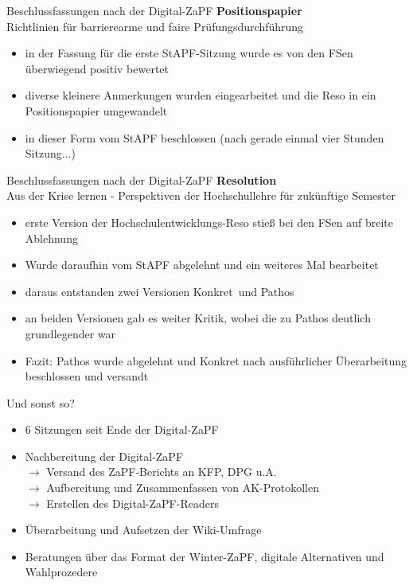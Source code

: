 \documentclass[compress, aspectratio=169]{beamer}
\begin{document}
\begin{frame}{Beschlussfassungen nach der Digital-ZaPF}
\textbf{Positionspapier}\\
Richtlinien für barrierearme und faire Prüfungsdurchführung
\begin{itemize}
\item in der Fassung für die erste StAPF-Sitzung wurde es von den FSen überwiegend positiv bewertet
\item diverse kleinere Anmerkungen wurden eingearbeitet und die Reso in ein Positionspapier umgewandelt
\item in dieser Form vom StAPF beschlossen (nach gerade einmal vier Stunden Sitzung...)
\end{itemize}
\end{frame}

\begin{frame}{Beschlussfassungen nach der Digital-ZaPF}
\textbf{Resolution}\\
Aus der Krise lernen - Perspektiven der Hochschullehre für zukünftige Semester
\begin{itemize}
\item erste Version der Hochschulentwicklungs-Reso stieß bei den FSen auf breite Ablehnung
\item Wurde daraufhin vom StAPF abgelehnt und ein weiteres Mal bearbeitet
\item daraus entstanden zwei Versionen \glqq Konkret\grqq\ und \glqq Pathos\grqq
\item an beiden Versionen gab es weiter Kritik, wobei die zu Pathos deutlich grundlegender war
\item Fazit: Pathos wurde abgelehnt und Konkret nach ausführlicher Überarbeitung beschlossen und versandt
\end{itemize}
\end{frame}

\begin{frame}{Und sonst so?}
\begin{itemize}
\item 6 Sitzungen seit Ende der Digital-ZaPF
\item Nachbereitung der Digital-ZaPF\\
$\rightarrow$ Versand des ZaPF-Berichts an KFP, DPG u.A.\\
$\rightarrow$ Aufbereitung und Zusammenfassen von AK-Protokollen\\
$\rightarrow$ Erstellen des Digital-ZaPF-Readers
\item Überarbeitung und Aufsetzen der Wiki-Umfrage
\item Beratungen über das Format der Winter-ZaPF, digitale Alternativen und Wahlprozedere
\end{itemize}
\end{frame}
\end{document}
